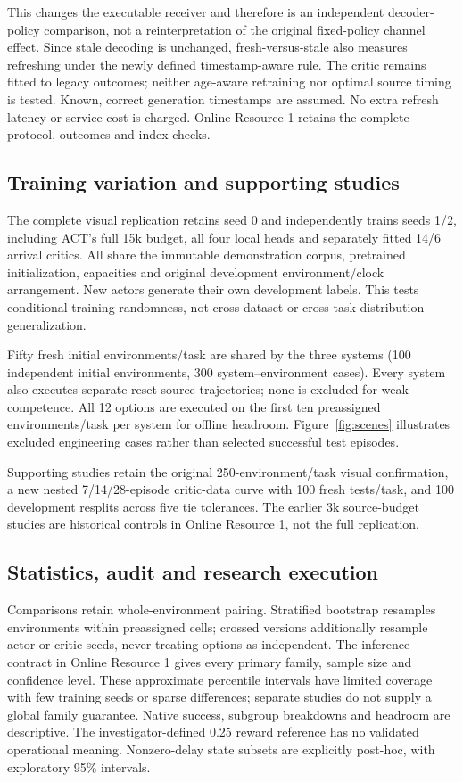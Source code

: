 This changes the executable receiver and therefore is an independent decoder-policy comparison, not a reinterpretation of the original fixed-policy channel effect. Since stale decoding is unchanged, fresh-versus-stale also measures refreshing under the newly defined timestamp-aware rule. The critic remains fitted to legacy outcomes; neither age-aware retraining nor optimal source timing is tested. Known, correct generation timestamps are assumed. No extra refresh latency or service cost is charged. Online Resource 1 retains the complete protocol, outcomes and index checks.

\subsection{Training variation and supporting studies}\label{sec:fullseedsetup}
The complete visual replication retains seed 0 and independently trains seeds 1/2, including ACT's full 15k budget, all four local heads and separately fitted 14/6 arrival critics. All share the immutable demonstration corpus, pretrained initialization, capacities and original development environment/clock arrangement. New actors generate their own development labels. This tests conditional training randomness, not cross-dataset or cross-task-distribution generalization.

Fifty fresh initial environments/task are shared by the three systems (100 independent initial environments, 300 system--environment cases). Every system also executes separate reset-source trajectories; none is excluded for weak competence. All 12 options are executed on the first ten preassigned environments/task per system for offline headroom. Figure~\ref{fig:scenes} illustrates excluded engineering cases rather than selected successful test episodes.

Supporting studies retain the original 250-environment/task visual confirmation, a new nested 7/14/28-episode critic-data curve with 100 fresh tests/task, and 100 development resplits across five tie tolerances. The earlier 3k source-budget studies are historical controls in Online Resource 1, not the full replication.

\subsection{Statistics, audit and research execution}\label{sec:statistics}
Comparisons retain whole-environment pairing. Stratified bootstrap resamples environments within preassigned cells; crossed versions additionally resample actor or critic seeds, never treating options as independent. The inference contract in Online Resource 1 gives every primary family, sample size and confidence level. These approximate percentile intervals have limited coverage with few training seeds or sparse differences; separate studies do not supply a global family guarantee. Native success, subgroup breakdowns and headroom are descriptive. The investigator-defined 0.25 reward reference has no validated operational meaning. Nonzero-delay state subsets are explicitly post-hoc, with exploratory 95\% intervals.

